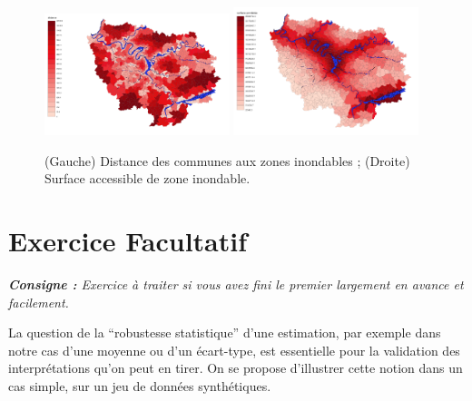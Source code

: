 \begin{figure}
\centering
\includegraphics[width=0.48\textwidth]{maps/distance2}
\includegraphics[width=0.48\textwidth]{maps/surfponderee}
\caption{(Gauche) Distance des communes aux zones inondables ; (Droite) Surface accessible de zone inondable.}
\end{figure}





%
%





\section*{Exercice Facultatif}


\textit{\textbf{Consigne : }Exercice à traiter si vous avez fini le premier largement en avance et facilement.}

\bigskip

La question de la ``robustesse statistique'' d'une estimation, par exemple dans notre cas d'une moyenne ou d'un écart-type, est essentielle pour la validation des interprétations qu'on peut en tirer. On se propose d'illustrer cette notion dans un cas simple, sur un jeu de données synthétiques.












